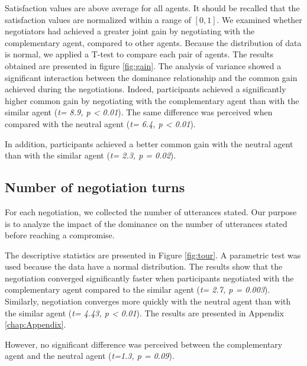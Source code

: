 \documentclass[10pt, a4paper, twocolumn]{article} %
\begin{document}
	Satisfaction values are above average for all agents. It should be recalled that the satisfaction values are normalized within a range of $[0, 1] $. We examined whether negotiators had achieved a greater joint gain by negotiating with the complementary agent, compared to other agents. Because the  distribution of data is normal, we applied a T-test to compare each pair of agents. The results obtained are presented in figure \ref{fig:gain}. The analysis of variance showed a significant interaction between the dominance relationship and the common gain achieved during the negotiations. Indeed, participants achieved a significantly higher common gain by negotiating with the complementary agent than with the similar agent (\emph{t= 8.9, p < 0.01}). The same difference was perceived when compared with the neutral agent (\emph{t= 6.4, p < 0.01}).
	
	In addition, participants achieved a better common gain with the neutral agent than with the similar agent (\emph{t= 2.3, p = 0.02}).
	
	\subsection{Number of negotiation turns}
	
	For each negotiation, we collected the number of utterances stated. Our purpose is to analyze the impact of the dominance on the number of utterances stated before reaching a compromise. 
	
	The descriptive statistics are presented in Figure \ref{fig:tour}. A parametric test was used because the data have a normal distribution. The results show that the negotiation converged significantly faster when participants negotiated with the complementary agent compared to the similar agent (\emph{t= 2.7, p = 0.003}). Similarly, negotiation converges more quickly with the neutral agent than with the similar agent (\emph{t= 4.43, p < 0.01}).  The results are presented in Appendix \ref{chap:Appendix}.
	
	However, no significant difference was perceived between the complementary agent and the neutral agent (\emph{t=1.3, p = 0.09}).
\end{document}
